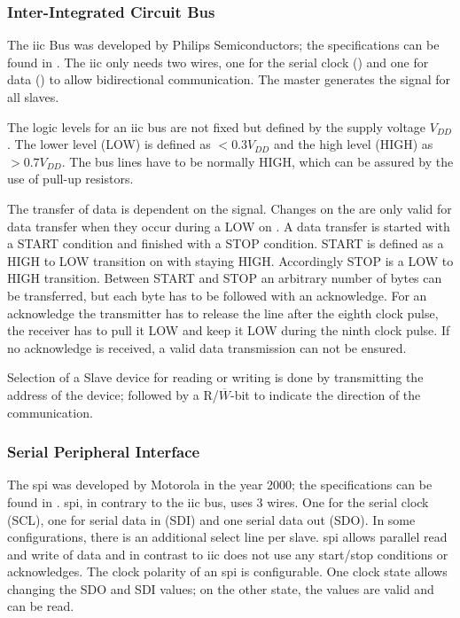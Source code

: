 \subsubsection{Inter-Integrated Circuit Bus}
\label{sec:iic}
The \ac{iic} Bus was developed by Philips Semiconductors; the specifications can be found in \cite{iic}. The \ac{iic} only needs two wires, one for the serial clock () and one for data () to allow bidirectional communication. The master generates the  signal for all slaves.

The logic levels for an \ac{iic} bus are not fixed but defined by the supply voltage $V_{DD}$. The lower level (LOW) is defined as $<0.3V_{DD}$ and the high level (HIGH) as $>0.7V_{DD}$. The bus lines have to be normally HIGH, which can be assured by the use of pull-up resistors. 

The transfer of data is dependent on the  signal. Changes on the  are only valid for data transfer when they occur during a LOW on . A data transfer is started with a START condition and finished with a STOP condition. START is defined as a HIGH to LOW transition on  with  staying HIGH. Accordingly STOP is a LOW to HIGH  transition.
Between START and STOP an arbitrary number of bytes can be transferred, but each byte has to be followed with an acknowledge. For an acknowledge the transmitter has to release the  line after the eighth clock pulse, the receiver has to pull it LOW and keep it LOW during the ninth clock pulse. If no acknowledge is received, a valid data transmission can not be ensured.

Selection of a Slave device for reading or writing is done by transmitting the address of the device; followed by a R/$\overline{W}$-bit to indicate the direction of the communication.

\subsubsection{Serial Peripheral Interface}
The \ac{spi} was developed by Motorola in the year 2000; the specifications can be found in \cite{spi}.
\ac{spi}, in contrary to the \ac{iic} bus, uses 3 wires. One for the serial clock (SCL), one for serial data in (SDI) and one serial data out (SDO). In some configurations, there is an additional select line per slave. \ac{spi} allows parallel read and write of data and in contrast to \ac{iic} does not use any start/stop conditions or acknowledges. 
The clock polarity of an \ac{spi} is configurable. One clock state allows changing the SDO and SDI values; on the other state, the values are valid and can be read.

